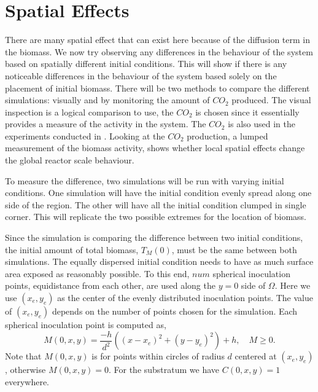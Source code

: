 \section{Spatial Effects}

There are many spatial effect that can exist here because of the diffusion term in the biomass.
We now try observing any differences in the behaviour of the system based on spatially different initial conditions.
This will show if there is any noticeable differences in the behaviour of the system based solely on the placement of initial biomass.
There will be two methods to compare the different simulations: visually and by monitoring the amount of $CO_2$ produced.
The visual inspection is a logical comparison to use, the $CO_2$ is chosen since it essentially provides a measure of the activity in the system.
The $CO_2$ is also used in the experiments conducted in \cite{dumitrache2014understanding}.
Looking at the $CO_2$ production, a lumped measurement of the biomass activity, shows whether local spatial effects change the global reactor scale behaviour.

To measure the difference, two simulations will be run with varying initial conditions.
One simulation will have the initial condition evenly spread along one side of the region.
The other will have all the initial condition clumped in single corner.
This will replicate the two possible extremes for the location of biomass.


Since the simulation is comparing the difference between two initial conditions, the initial amount of total biomass, $T_M(0)$, must be the same between both simulations.
The equally dispersed initial condition needs to have as much surface area exposed as reasonably possible.
To this end, $num$ spherical inoculation points, equidistance from each other, are used along the $y=0$ side of $\Omega$.
Here we use $(x_e, y_e)$ as the center of the evenly distributed inoculation points.
The value of $(x_e, y_e)$ depends on the number of points chosen for the simulation.
Each spherical inoculation point is computed as,
\begin{equation}
M(0,x,y) = \frac{-h}{d^2} ((x-x_e)^2 +(y-y_e)^2) + h, \quad M \ge 0.
\end{equation}
Note that $M(0,x,y)$ is for points within circles of radius $d$ centered at $(x_e, y_e)$, otherwise $M(0,x,y) = 0$.
For the substratum we have $C(0,x,y) = 1$ everywhere.

